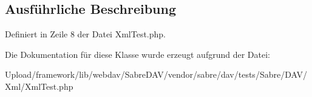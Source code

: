 \subsection{Ausführliche Beschreibung}


Definiert in Zeile 8 der Datei Xml\+Test.\+php.



Die Dokumentation für diese Klasse wurde erzeugt aufgrund der Datei\+:\begin{DoxyCompactItemize}
\item 
Upload/framework/lib/webdav/\+Sabre\+D\+A\+V/vendor/sabre/dav/tests/\+Sabre/\+D\+A\+V/\+Xml/Xml\+Test.\+php\end{DoxyCompactItemize}
